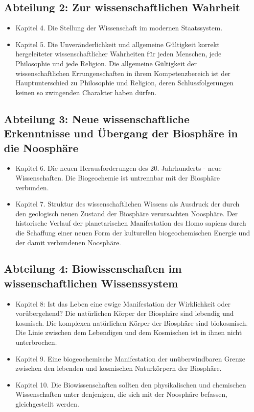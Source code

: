 \documentclass[11pt,a4paper]{article}
\begin{document}
\subsection{Abteilung 2: Zur wissenschaftlichen Wahrheit}

\begin{itemize}
\item Kapitel 4.  Die Stellung der Wissenschaft im modernen Staatssystem. 

\item Kapitel 5.  Die Unveränderlichkeit und allgemeine Gültigkeit korrekt
  hergeleiteter wissenschaftlicher Wahrheiten für jeden Menschen, jede
  Philosophie und jede Religion. Die allgemeine Gültigkeit der
  wissenschaftlichen Errungenschaften in ihrem Kompetenzbereich ist der
  Hauptunterschied zu Philosophie und Religion, deren Schlussfolgerungen
  keinen so zwingenden Charakter haben dürfen.
\end{itemize}

\subsection{Abteilung 3: Neue wissenschaftliche Erkenntnisse und Übergang der
  Biosphäre in die Noosphäre}

\begin{itemize}
\item Kapitel 6.  Die neuen Herausforderungen des 20. Jahrhunderts - neue
  Wissenschaften. Die Biogeochemie ist untrennbar mit der Biosphäre verbunden.

\item Kapitel 7.  Struktur des wissenschaftlichen Wissens als Ausdruck der
  durch den geologisch neuen Zustand der Biosphäre verursachten Noosphäre. Der
  historische Verlauf der planetarischen Manifestation des Homo sapiens durch
  die Schaffung einer neuen Form der kulturellen biogeochemischen Energie und
  der damit verbundenen Noosphäre.
\end{itemize}

\subsection{Abteilung 4: Biowissenschaften im wissenschaftlichen
  Wissenssystem} 

\begin{itemize}
\item Kapitel 8: Ist das Leben eine ewige Manifestation der Wirklichkeit oder
  vorübergehend? Die natürlichen Körper der Biosphäre sind lebendig und
  kosmisch. Die komplexen natürlichen Körper der Biosphäre sind
  biokosmisch. Die Linie zwischen dem Lebendigen und dem Kosmischen ist in
  ihnen nicht unterbrochen.

\item Kapitel 9.  Eine biogeochemische Manifestation der unüberwindbaren
  Grenze zwischen den lebenden und kosmischen Naturkörpern der Biosphäre.

\item Kapitel 10.  Die Biowissenschaften sollten den physikalischen und
  chemischen Wissenschaften unter denjenigen, die sich mit der Noosphäre
  befassen, gleichgestellt werden.
\end{itemize}
\end{document}
